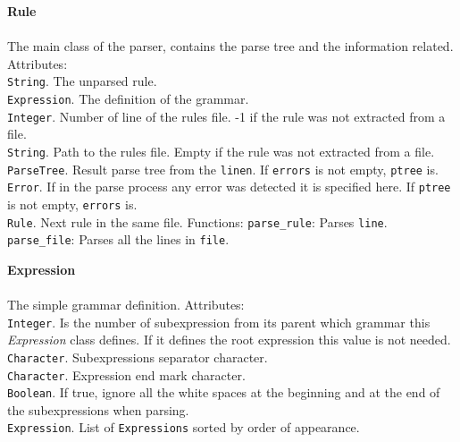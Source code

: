 \begin{list}{}{}
  \item {\bf Rule}\\
    \\
    The main class of the parser, contains the parse tree and the information related.
    \subitem Attributes:
      \\
	\texttt{String}. The unparsed rule.
      \\
	\texttt{Expression}. The definition of the grammar.
      \\
	\texttt{Integer}. Number of line of the rules file. -1 if the rule was not extracted from a file.
      \\
	\texttt{String}. Path to the rules file. Empty if the rule was not extracted from a file.
      \\
	\texttt{ParseTree}. Result parse tree from the \texttt{linen}. If \texttt{errors} is not empty, \texttt{ptree} is.
      \\
	\texttt{Error}. If in the parse process any error was detected it is specified here. If \texttt{ptree} is not empty, 
	\texttt{errors} is.
      \\
	\texttt{Rule}. Next rule in the same file.
    \subitem Functions:
      \subsubitem \texttt{parse\_rule}:
	Parses \texttt{line}.
      \subsubitem \texttt{parse\_file}:
	Parses all the lines in \texttt{file}.
  \item {\bf Expression}\\
    \\
    The simple grammar definition.
    \subitem Attributes:
      \\
	\texttt{Integer}. Is the number of subexpression from its parent which grammar this \emph{Expression} class defines. If it defines
	the root expression this value is not needed.
      \\
	\texttt{Character}. Subexpressions separator character.
      \\
	\texttt{Character}. Expression end mark character.
      \\
	\texttt{Boolean}. If true, ignore all the white spaces at the beginning and at the end of the subexpressions when parsing.
      \\
	\texttt{Expression}. List of \texttt{Expressions} sorted by order of appearance.\\

\end{list}
